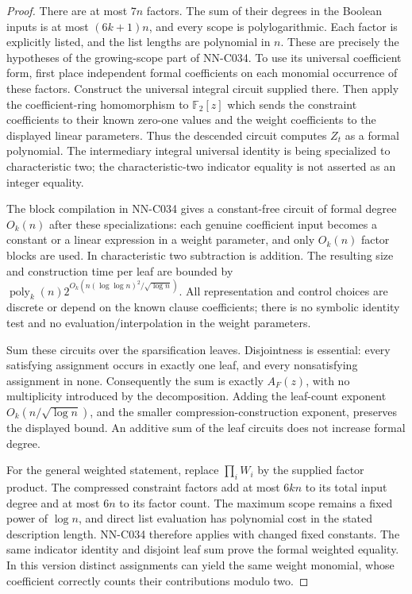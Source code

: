\begin{proof}
There are at most $7n$ factors. The sum of their degrees in the Boolean inputs is at most $(6k+1)n$, and every scope is polylogarithmic. Each factor is explicitly listed, and the list lengths are polynomial in $n$. These are precisely the hypotheses of the growing-scope part of NN-C034. To use its universal coefficient form, first place independent formal coefficients on each monomial occurrence of these factors. Construct the universal integral circuit supplied there. Then apply the coefficient-ring homomorphism to $\mathbb F_2[z]$ which sends the constraint coefficients to their known zero-one values and the weight coefficients to the displayed linear parameters. Thus the descended circuit computes $Z_t$ as a formal polynomial. The intermediary integral universal identity is being specialized to characteristic two; the characteristic-two indicator equality is not asserted as an integer equality.

The block compilation in NN-C034 gives a constant-free circuit of formal degree $O_k(n)$ after these specializations: each genuine coefficient input becomes a constant or a linear expression in a weight parameter, and only $O_k(n)$ factor blocks are used. In characteristic two subtraction is addition. The resulting size and construction time per leaf are bounded by $\operatorname{poly}_k(n)2^{O_k(n(\log\log n)^2/\sqrt{\log n})}$. All representation and control choices are discrete or depend on the known clause coefficients; there is no symbolic identity test and no evaluation/interpolation in the weight parameters.

Sum these circuits over the sparsification leaves. Disjointness is essential: every satisfying assignment occurs in exactly one leaf, and every nonsatisfying assignment in none. Consequently the sum is exactly $A_F(z)$, with no multiplicity introduced by the decomposition. Adding the leaf-count exponent $O_k(n/\sqrt{\log n})$, and the smaller compression-construction exponent, preserves the displayed bound. An additive sum of the leaf circuits does not increase formal degree.

For the general weighted statement, replace $\prod_iW_i$ by the supplied factor product. The compressed constraint factors add at most $6kn$ to its total input degree and at most $6n$ to its factor count. The maximum scope remains a fixed power of $\log n$, and direct list evaluation has polynomial cost in the stated description length. NN-C034 therefore applies with changed fixed constants. The same indicator identity and disjoint leaf sum prove the formal weighted equality. In this version distinct assignments can yield the same weight monomial, whose coefficient correctly counts their contributions modulo two.


\end{proof}
